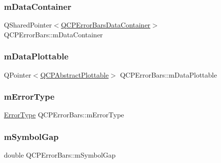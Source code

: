 \subsubsection{\texorpdfstring{mDataContainer}{mDataContainer}}
{\footnotesize\ttfamily Q\+Shared\+Pointer$<$\mbox{\hyperlink{qcustomplot_8h_a8c4472a4da738e0ddbf6b03222c39906}{Q\+C\+P\+Error\+Bars\+Data\+Container}}$>$ Q\+C\+P\+Error\+Bars\+::m\+Data\+Container\hspace{0.3cm}{\ttfamily [protected]}}

\mbox{\label{class_q_c_p_error_bars_a14b6a5b49295990da84a05a3a89026bb}} 
\subsubsection{\texorpdfstring{mDataPlottable}{mDataPlottable}}
{\footnotesize\ttfamily Q\+Pointer$<$\mbox{\hyperlink{class_q_c_p_abstract_plottable}{Q\+C\+P\+Abstract\+Plottable}}$>$ Q\+C\+P\+Error\+Bars\+::m\+Data\+Plottable\hspace{0.3cm}{\ttfamily [protected]}}

\mbox{\label{class_q_c_p_error_bars_af9fd3117b86aac728c9e8e87c406ed9a}} 
\subsubsection{\texorpdfstring{mErrorType}{mErrorType}}
{\footnotesize\ttfamily \mbox{\hyperlink{class_q_c_p_error_bars_a95f0220f11a72648b96480a85ce26474}{Error\+Type}} Q\+C\+P\+Error\+Bars\+::m\+Error\+Type\hspace{0.3cm}{\ttfamily [protected]}}

\mbox{\label{class_q_c_p_error_bars_a5cb5628b75e5aff0875710705666ec57}} 
\subsubsection{\texorpdfstring{mSymbolGap}{mSymbolGap}}
{\footnotesize\ttfamily double Q\+C\+P\+Error\+Bars\+::m\+Symbol\+Gap\hspace{0.3cm}{\ttfamily [protected]}}

